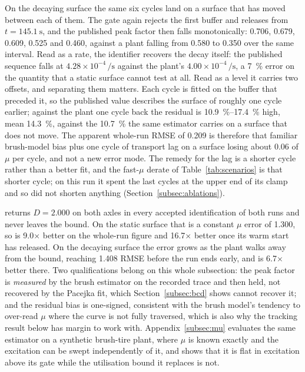 On the decaying surface the same six cycles land on a surface that has moved
between each of them. The gate again rejects the first buffer and releases from
$t=\SI{145.1}{\second}$, and the published peak factor then falls monotonically:
\num{0.706}, \num{0.679}, \num{0.609}, \num{0.525} and \num{0.460}, against a
plant falling from \num{0.580} to \num{0.350} over the same interval. Read as a
rate, the identifier recovers the decay itself: the published sequence falls at
$4.28\times10^{-4}\,\si{\per\second}$ against the plant's
$4.00\times10^{-4}\,\si{\per\second}$, a
\SI{7}{\percent} error on the quantity that a static surface cannot test at all.
Read as a level it carries two offsets, and separating them matters. Each cycle
is fitted on the buffer that preceded it, so the published value describes the
surface of roughly one cycle earlier; against the plant one cycle back the
residual is \SIrange{10.9}{17.4}{\percent} high, mean \SI{14.3}{\percent},
against the \SI{10.7}{\percent} the same estimator carries on a surface that
does not move. The apparent whole-run RMSE of \num{0.209} is therefore that
familiar brush-model bias plus one cycle of transport lag on a surface losing
about \num{0.06} of $\mu$ per cycle, and not a new error mode. The remedy for
the lag is a shorter cycle rather than a better fit, and the fast-$\mu$ derate
of Table~\ref{tab:scenarios} is that shorter cycle; on this run it spent the
last cycles at the upper end of its clamp and so did not shorten anything
(Section~\ref{subsec:ablations}).

\basearm{} returns $D=\num{2.000}$ on both axles in every accepted
identification of both runs and never leaves the bound. On the static surface
that is a constant $\mu$ error of \num{1.300}, so \oursarm{} is
\num{9.0}$\times$ better on the whole-run figure and \num{16.7}$\times$ better
once its warm start has released. On the decaying surface the error grows as
the plant walks away from the bound, reaching \num{1.408} RMSE before the run
ends early, and \oursarm{} is \num{6.7}$\times$ better there. Two
qualifications belong on this whole subsection: the peak factor is
\emph{measured} by the brush estimator on the recorded trace and then held, not
recovered by the Pacejka fit, which Section~\ref{subsec:bcd} shows cannot
recover it; and the residual bias is one-signed, consistent with the brush
model's tendency to over-read $\mu$ where the curve is not fully traversed,
which is also why the tracking result below has margin to work with.
Appendix~\ref{subsec:mu} evaluates the same estimator on a synthetic brush-tire
plant, where $\mu$ is known exactly and the excitation can be swept
independently of it, and shows that it is flat in excitation above its gate
while the utilisation bound it replaces is not.

